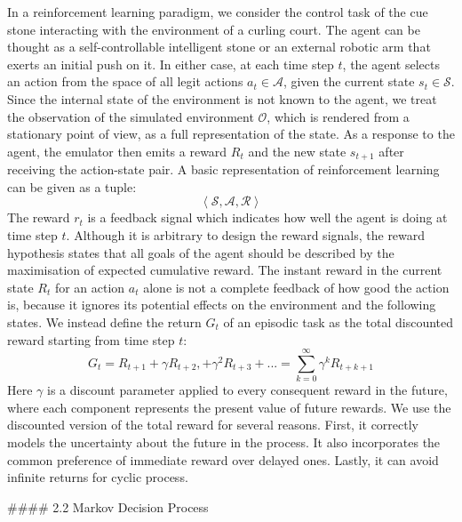 \documentclass[twoside,12pt,a4paper]{article}
\begin{document}
In a reinforcement learning paradigm, we consider the control task of the cue stone interacting with the environment of a curling court. The agent can be thought as a self-controllable intelligent stone or an external robotic arm that exerts an initial push on it. In either case, at each time step $t$, the agent selects an action from the space of all legit actions $a_t \in\mathcal A$, given the current state $s_t \in \mathcal S$. Since the internal state of the environment is not known to the agent, we treat the observation of the simulated environment $\mathcal O$, which is rendered from a stationary point of view, as a full representation of the state. As a response to the agent, the emulator then emits a reward $R_t$ and the new state $s_{t+1}$ after receiving the action-state pair. A basic representation of reinforcement learning can be given as a tuple:
$$
\left\langle \mathcal {S,A, R} \right\rangle
$$
The reward $r_t$ is a feedback signal which indicates how well the agent is doing at time step $t$. Although it is arbitrary to design the reward signals, the reward hypothesis states that all goals of the agent should be described by the maximisation of expected cumulative reward. The instant reward in the current state $R_t$ for an action $a_t$ alone is not a complete feedback of how good the action is, because it ignores its potential effects on the environment and the following states. We instead define the return $G_t$ of an episodic task as the total discounted reward starting from time step $t$:
$$
G_t = R_{t+1} + \gamma R_{t+2}, +\gamma^2 R_{t+3}+... = \sum_{k=0}^\infty\gamma^kR_{t+k+1}
$$
Here $\gamma$ is a discount parameter applied to every consequent reward in the future, where each component represents the present value of future rewards. We use the discounted version of the total reward for several reasons. First, it correctly models the uncertainty about the future in the process. It also incorporates the common preference of immediate reward over delayed ones. Lastly, it can avoid infinite returns for cyclic process.



#### 2.2 Markov Decision Process
\end{document}
